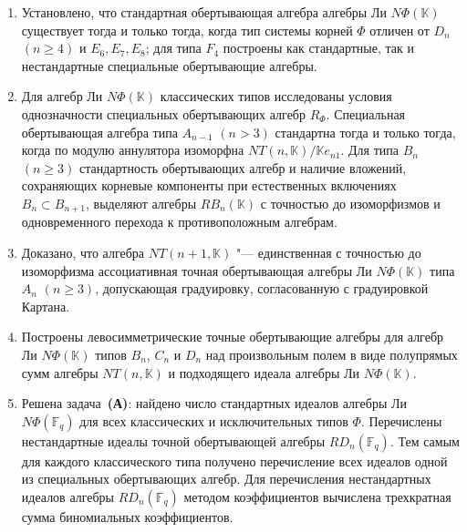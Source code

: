 \begin{enumerate}
    \item Установлено, что стандартная обертывающая алгебра алгебры Ли
          $N\Phi(\mathbb{K})$ существует тогда и только тогда, когда тип системы корней
          $\Phi$ отличен от $D_n$ $(n\geq4)$ и $E_6,E_7,E_8$; для типа $F_4$ построены
          как стандартные, так и нестандартные специальные обертывающие алгебры.

    \item Для алгебр Ли $N\Phi(\mathbb{K})$ классических типов исследованы условия
          однозначности специальных обертывающих алгебр $R_{\Phi}$. Специальная
          обертывающая алгебра типа $A_{n-1}$ $(n>3)$ стандартна тогда и только тогда,
          когда по модулю аннулятора изоморфна $NT(n,\mathbb{K})/\mathbb{K}e_{n1}$. Для
          типа $B_n$ $(n\geq3)$ стандартность обертывающих алгебр и наличие вложений,
          сохраняющих корневые компоненты при естественных включениях $B_n\subset
          B_{n+1}$, выделяют алгебры $RB_n(\mathbb{K})$ с точностью до изоморфизмов и
          одновременного перехода к противоположным алгебрам.

    \item Доказано, что алгебра $NT(n+1,\mathbb{K})$ "--- единственная с точностью до
          изоморфизма ассоциативная точная обертывающая алгебры Ли $N\Phi(\mathbb{K})$
          типа $A_n$ $(n\geq 3)$, допускающая градуировку, согласованную с градуировкой
          Картана.

    \item Построены левосимметрические точные обертывающие алгебры для алгебр Ли
          $N\Phi(\mathbb{K})$ типов $B_n$, $C_n$ и $D_n$ над произвольным полем в виде
          полупрямых сумм алгебры $NT(n,\mathbb{K})$ и подходящего идеала алгебры Ли
          $N\Phi(\mathbb{K})$.

    \item Решена задача~\textbf{(А)}: найдено число стандартных идеалов алгебры Ли
          $N\Phi(\mathbb{F}_q)$ для всех классических и исключительных типов $\Phi$.
          Перечислены нестандартные идеалы точной обертывающей алгебры
          $RD_n(\mathbb{F}_q)$. Тем самым для каждого классического типа получено
          перечисление всех идеалов одной из специальных обертывающих алгебр. Для
          перечисления нестандартных идеалов алгебры $RD_n(\mathbb{F}_q)$ методом
          коэффициентов вычислена трехкратная сумма биномиальных коэффициентов.
\end{enumerate}
